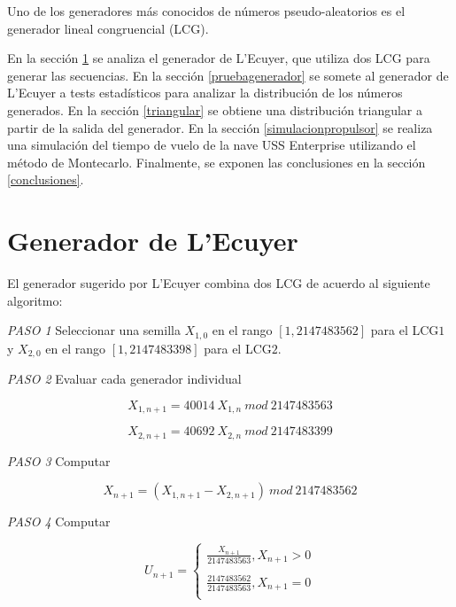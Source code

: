 \documentclass{sig-alternate}
\begin{document}
Uno de los generadores m\'{a}s conocidos de n\'{u}meros pseudo-aleatorios es
el generador lineal congruencial (LCG). 

En la secci\'{o}n \ref{generador} se 
analiza el generador de L'Ecuyer, que utiliza dos LCG para generar las secuencias.
En la secci\'{o}n \ref{pruebagenerador} se somete al generador de L'Ecuyer
a tests estad\'{i}sticos para analizar la distribuci\'{o}n de los n\'{u}meros
generados. En la secci\'{o}n \ref{triangular} se obtiene una distribuci\'{o}n
triangular a partir de la salida del generador. En la secci\'{o}n
\ref{simulacionpropulsor} se realiza una simulaci\'{o}n del tiempo de vuelo
de la nave USS Enterprise utilizando el m\'{e}todo de Montecarlo. Finalmente,
se exponen las conclusiones en la secci\'{o}n \ref{conclusiones}.

\section{Generador de L'Ecuyer}\label{generador}

El generador sugerido por L'Ecuyer combina dos LCG de acuerdo al siguiente 
algoritmo:

\textit{PASO 1}
Seleccionar una semilla $X_{1,0}$ en el rango $[1, 2147483562]$ para el LCG$1$
y $X_{2,0}$ en el rango $[1, 2147483398]$ para el LCG$2$.

\textit{PASO 2}
Evaluar cada generador individual

\begin{equation}
\label{LCG1}
X_{1,n+1} = 40014 \ X_{1,n} \ mod \ 2147483563
\end{equation}

\begin{equation}
\label{LCG2}
X_{2,n+1} = 40692 \ X_{2,n} \ mod \ 2147483399
\end{equation}

\textit{PASO 3}
Computar

\begin{equation}
\label{xn}
X_{n+1} = (X_{1,n+1} - X_{2,n+1}) \ mod \ 2147483562
\end{equation}

\textit{PASO 4}
Computar

\begin{equation}
\label{un}
U_{n+1} = 
    \begin{cases}
    \frac{X_{n+1}}{2147483563}, X_{n+1} > 0\\
     \ \\
    \frac{2147483562}{2147483563}, X_{n+1} = 0\\
    \end{cases}
\end{equation}
\end{document}

